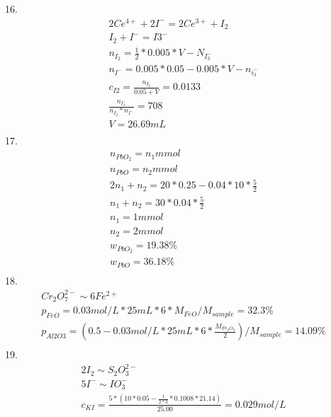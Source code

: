 \documentclass{article}
\begin{document}
16.\begin{equation}
    \begin{multlined}
        2Ce^{4+} + 2I^- = 2Ce^{3+} + I_2\\
        I_2 + I^- = I3^-\\
        n_{I_2} = \frac{1}{2}* 0.005 * V - N_{I_3^-}\\
        n_{I^-} = 0.005*0.05 - 0.005*V - n_{i_3^-}\\
        c_{I2} = \frac{n_{I_2}}{0.05 + V} = 0.0133\\
        \frac{n_{I_3^-}}{n_{I_2}*n_{I^-}} = 708\\
        V = 26.69 mL\\
    \end{multlined}
\end{equation}
17.\begin{equation}
    \begin{multlined}
        n_{PbO_2} = n_1 mmol\\
        n_{PbO} = n_2 mmol\\
        2n_1 + n_2 = 20*0.25 - 0.04*10*\frac{5}{2}\\
        n_1 + n_2 = 30 * 0.04 * \frac{5}{2}\\
        n_1 = 1 mmol\\
        n_2 = 2 mmol\\
        w_{PbO_2} = 19.38\%\\
        w_{PbO} = 36.18\%\\
    \end{multlined}
\end{equation}
18.\begin{equation}
    \begin{multlined}
        Cr_2O_7^{2-} \sim 6 Fe^{2+}\\
        p_{FeO} = 0.03 mol/L * 25 mL * 6 * M_{FeO} / M_{sample} = 32.3\%\\
        p_{Al2O3} = (0.5 - 0.03 mol/L * 25 mL * 6 * \frac{M_{Fe_2O_3}}{2}) / M_{sample} = 14.09\%\\
    \end{multlined}
\end{equation}
19.\begin{equation}
    \begin{multlined}
        2I_2\sim S_2O_3^{2-}\\
        5I^- \sim IO_3^-\\
        c_{KI} = \frac{5*(10*0.05 - \frac{1}{2*3}*0.1008*21.14)}{25.00} = 0.029 mol/L\\
    \end{multlined}
\end{equation}
\end{document}
